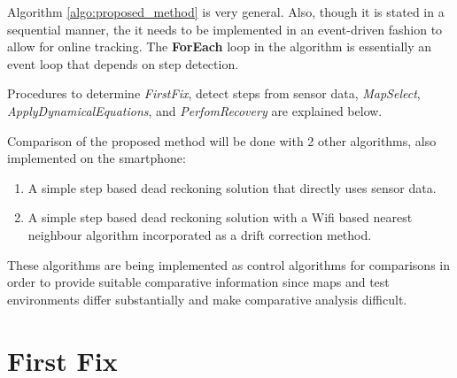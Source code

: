 \documentclass[10pt,journal,letterpaper,compsoc]{IEEEtran}
\begin{document}
Algorithm \ref{algo:proposed_method} is very general. Also, though it is 
stated in a sequential manner, the it needs to 
be implemented in an event-driven fashion to allow for online tracking. 
The \textbf{ForEach} loop in the algorithm is essentially an event loop 
that depends on step detection.

Procedures to determine \emph{FirstFix}, detect steps from sensor data, 
\emph{MapSelect}, \emph{ApplyDynamicalEquations}, and \emph{PerfomRecovery} are explained
below.


Comparison of the proposed method will be done with 2 other algorithms, also
implemented on the smartphone: 

\begin{enumerate}
\item A simple step based dead reckoning solution that directly uses sensor data.
\item A simple step based dead reckoning solution with a Wifi based nearest neighbour algorithm incorporated as a 
    drift correction method.    
\end{enumerate}

These algorithms are being implemented as control algorithms for comparisons
in order to provide suitable comparative information since maps and test 
environments differ substantially and make comparative analysis difficult.

\section{First Fix\label{sec:first_fix}}
\end{document}
